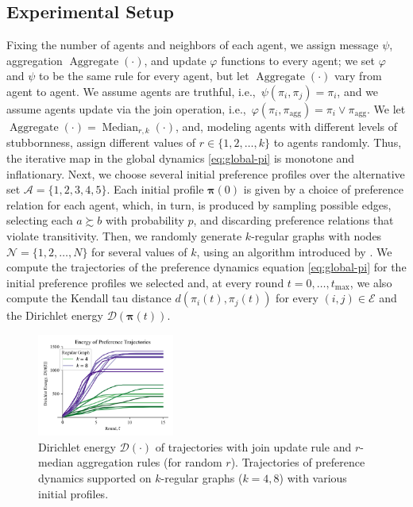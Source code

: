 \documentclass[conference]{ieeeconf}
\newcommand{\N}{\mathcal{N}}
\newcommand{\A}{\mathcal{A}}
\newcommand{\E}{\mathcal{E}}
\newcommand{\D}{\mathcal{D}}
\newcommand{\prefers}{\succsim}
\newcommand{\profile}{\boldsymbol{\pi}}
\newcommand{\join}{\vee}
\DeclareMathOperator{\Aggregate}{Aggregate}
\DeclareMathOperator{\Median}{Median}
\begin{document}
\vspace{-0.25em}
\subsection{Experimental Setup}
\vspace{-0.25em}

 Fixing the number of agents and neighbors of each agent, we assign message $\psi$, aggregation $\Aggregate(\cdot)$, and update $\varphi$ functions to every agent; we set $\varphi$ and $\psi$ to be the same rule for every agent, but let $\Aggregate(\cdot)$ vary from agent to agent. We assume agents are truthful, i.e.,~$\psi(\pi_i,\pi_j) = \pi_i$, and we assume agents update via the join operation, i.e.,~$\varphi(\pi_i,\pi_{\mathrm{agg}}) = \pi_i \join \pi_{\mathrm{agg}}$. We let $\Aggregate(\cdot) = \Median_{r,k}(\cdot)$, and, modeling agents with different levels of stubbornness, assign different values of $r \in \{1,2,\dots,k\}$ to agents randomly. Thus, the iterative map in the global dynamics \eqref{eq:global-pi} is monotone and inflationary. Next, we choose several initial preference profiles over the alternative set $\A = \{1,2,3,4,5\}$. Each initial profile $\profile(0)$ is given by a choice of preference relation for each agent, which, in turn, is produced by sampling possible edges, selecting each $a \prefers b$ with probability $p$, and discarding preference relations that violate transitivity. Then, we randomly generate $k$-regular graphs with nodes $\N = \{1,2,\dots,N\}$ for several values of $k$, using an algorithm introduced by \cite{kim2003}. We compute the trajectories of the preference dynamics equation \eqref{eq:global-pi} for the initial preference profiles we selected and, at every round $t=0, \dots, t_{\max}$,  we also compute the Kendall tau distance $d\left(\pi_i(t),\pi_j(t)\right)$ for every $(i,j) \in \E$ and the Dirichlet energy $\D\left( \profile(t) \right)$.

 \begin{figure}
    \centering
    \includegraphics[width=0.4\textwidth]{figs/fig1.png}
    \caption{Dirichlet energy $\D(\cdot)$ of trajectories with join update rule and $r$-median aggregation rules (for random $r$). Trajectories of preference dynamics supported on $k$-regular graphs ($k=4,8$) with various initial profiles.}
    \label{fig:1}
    \vspace{-2em}
\end{figure}
\end{document}
